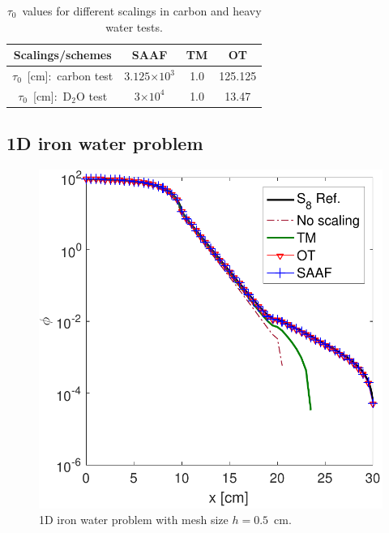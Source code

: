 \documentclass[review]{elsarticle}
\newcommand{\e}[1]{\ensuremath{\times 10^{#1}}}
\begin{document}
\begin{table}[h]
	\centering
	\caption{$\tau_0$\ values for different scalings in carbon and heavy water tests.}
	\label{t:t1}
	\begin{tabular}{|c|c|c|c|}
		\hline
		Scalings/schemes&SAAF & TM & OT\\
		\hline
		$\tau_0$\ [cm]:\ carbon test&$3.125\e{3}$ & 1.0 & 125.125\\
		\hline
		$\tau_0$\ [cm]:\ D$_2$O test& $3\e{4}$ & 1.0 & 13.47\\
		\hline
	\end{tabular}
\end{table}
\subsection{1D iron water problem}

\begin{figure}[ht!]
	
	\centering
	\includegraphics[width=.75\linewidth]{PHY_IW-120.pdf}
	\caption{1D iron water problem with mesh size $h=0.5$\ cm.}
	\label{f:iw120}
	
\end{figure}
\end{document}
